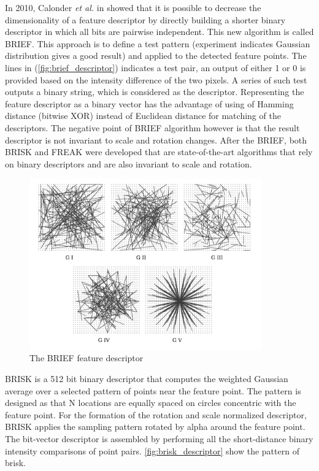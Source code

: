 In 2010, Calonder \textit{et al.} in \cite{calonder2010brief} showed that it is possible to decrease the dimensionality of a feature descriptor by directly building a shorter binary descriptor in which all bits are pairwise independent. This new algorithm is called BRIEF. This approach is to define a test pattern (experiment indicates Gaussian distribution gives a good result) and applied to the detected feature points. The lines in (\autoref{fig:brief_descriptor}) indicates a test pair, an output of either 1 or 0 is provided based on the intensity difference of the two pixels. A series of such test outputs a binary string, which is considered as the descriptor. Representing the feature descriptor as a binary vector has the advantage of using of Hamming distance (bitwise XOR) instead of Euclidean distance for matching of the descriptors. The negative point of BRIEF algorithm however is that the result descriptor is not invariant to scale and rotation changes. After the BRIEF, both BRISK \cite{leutenegger2011brisk} and FREAK \cite{alahi2012freak} were developed that are state-of-the-art algorithms that rely on binary descriptors and are also invariant to scale and rotation. \\

\begin{figure}[H]
  \centering
  \includegraphics[width=100mm]{figures/brief_descriptor}
  \caption{The BRIEF feature descriptor}\label{fig:brief_descriptor}
\end{figure}

BRISK is a 512 bit binary descriptor that computes the weighted Gaussian average over a selected pattern of points near the feature point. The pattern is designed as that N locations are equally spaced on circles concentric with the feature point. For the formation of the rotation and scale normalized descriptor, BRISK applies the sampling pattern rotated by alpha around the feature point. The bit-vector descriptor is assembled by performing all the short-distance binary intensity comparisons of point pairs. \autoref{fig:brisk_descriptor} show the pattern of brisk.\\

